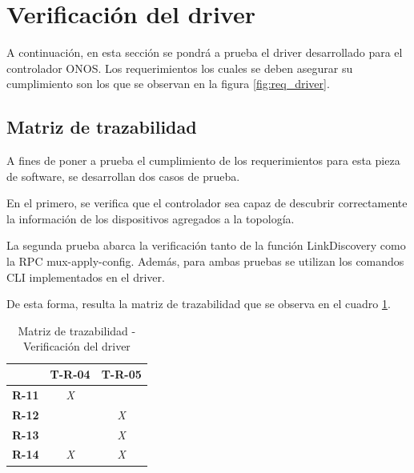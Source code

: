 
\section{Verificación del driver}

A continuación, en esta sección se pondrá a prueba el driver desarrollado para el controlador ONOS. Los requerimientos los cuales se deben asegurar su cumplimiento son los que se observan en la figura \ref{fig:req_driver}. 


\subsection{Matriz de trazabilidad}

A fines de poner a prueba el cumplimiento de los requerimientos para esta pieza de software, se desarrollan dos casos de prueba. 

En el primero, se verifica que el controlador sea capaz de descubrir correctamente la información de los dispositivos agregados a la topología. 

La segunda prueba abarca la verificación tanto de la función LinkDiscovery como la RPC mux-apply-config. Además, para ambas pruebas se utilizan los comandos CLI implementados en el driver.

De esta forma, resulta la matriz de trazabilidad que se observa en el cuadro \ref{tab:matriz_driver}.


\begin{table}[!h]
    \centering
    \begin{tabular}{|c|c|c|}
        \hline
        \textbf{}     & \textbf{T-R-04} & \textbf{T-R-05} \\ \hline
        \textbf{R-11} & \textit{X}      & \textit{}       \\ \hline
        \textbf{R-12} & \textit{}       & \textit{X}      \\ \hline
        \textbf{R-13} & \textit{}       & \textit{X}      \\ \hline
        \textbf{R-14} & \textit{X}      & \textit{X}      \\ \hline
        \end{tabular}
    \caption{Matriz de trazabilidad - Verificación del driver}
    \label{tab:matriz_driver}
\end{table}

